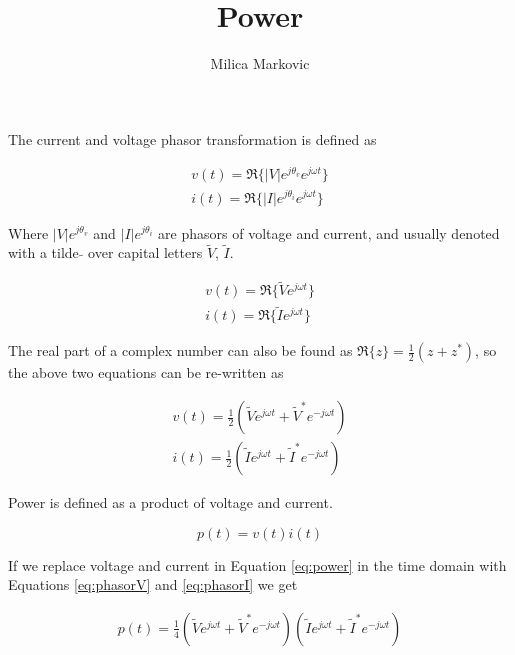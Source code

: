 \documentclass{ximera}
\title{Power}
\author{Milica Markovic}
\begin{document}
  
\begin{abstract}  

\end{abstract}  
\maketitle    



The current and voltage phasor transformation is defined as

\begin{eqnarray}
v(t)=\Re\{|V|e^{j\theta_v} e^{j \omega t}\} \\
i(t)=\Re\{|I|e^{j\theta_i} e^{j \omega t}\}
\end{eqnarray}

Where $|V|e^{j\theta_v}$ and $|I|e^{j\theta_i}$ are phasors of voltage and current, and usually denoted with a tilde $\tilde{}$ over capital letters  $\tilde{V}$, $\tilde{I}$.


\begin{eqnarray}
v(t)=\Re\{\tilde{V} e^{j \omega t}\} \\
i(t)=\Re\{\tilde{I} e^{j \omega t}\}
\end{eqnarray}


The real part of a complex number can also be found as $\Re\{z\}=\frac{1}{2}(z +z^*)$, so the above two equations can be re-written as

\begin{eqnarray}
v(t)=\frac{1}{2} ( \tilde{V}e^{j \omega t} + \tilde{V}^*e^{-j \omega t} ) \label{eq:phasorV}\\
i(t)=\frac{1}{2} ( \tilde{I}e^{j \omega t} + \tilde{I}^*e^{-j \omega t} ) \label{eq:phasorI} 
\end{eqnarray}

Power is defined as a product of voltage and current.

\begin{equation}
p(t) = v(t) i(t) \label{eq:power}
\end{equation}

If we replace voltage and current in Equation \ref{eq:power} in the time domain with Equations \ref{eq:phasorV} and \ref{eq:phasorI} we get



\begin{eqnarray}
p(t) =\frac{1}{4} ( \tilde{V}e^{j \omega t} + \tilde{V}^*e^{-j \omega t} ) ( \tilde{I}e^{j \omega t} + \tilde{I}^*e^{-j \omega t} ) 
\end{eqnarray}
\end{document}
